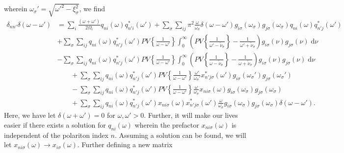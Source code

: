 wherein $\omega_\sigma' = \sqrt{\omega'^2 - \xi_\sigma^2}$, we find
\begin{equation}
\begin{split}
\delta_{nn'}\delta(\omega - \omega') &= \sum_i\frac{(\omega + \omega')}{2\Omega_i}q_{ni}(\omega)q_{n'i}^*(\omega') + \sum_\sigma\sum_{ij}\pi^2\frac{\omega}{\omega_\sigma}\delta(\omega - \omega')g_{i\sigma}(\omega_\sigma)g_{j\sigma}(\omega_\sigma)q_{ni}(\omega)q_{n'j}^*(\omega')\\
& + \sum_\sigma\sum_{ij}q_{ni}(\omega)q_{n'j}^*(\omega')PV\left\{\frac{1}{\omega - \omega'}\right\}\int_0^\infty\left(PV\left\{\frac{1}{\omega' - \tilde{\nu}_\sigma}\right\} - \frac{1}{\omega' + \tilde{\nu}_\sigma}\right)g_{i\sigma}(\nu)g_{j\sigma}(\nu)\;\mathrm{d}\nu\\
&- \sum_\sigma\sum_{ij}q_{ni}(\omega)q_{n'j}^*(\omega')PV\left\{\frac{1}{\omega - \omega'}\right\}\int_0^\infty\left(PV\left\{\frac{1}{\omega - \tilde{\nu}_\sigma}\right\} - \frac{1}{\omega + \tilde{\nu}_\sigma}\right)g_{i\sigma}(\nu)g_{j\sigma}(\nu)\;\mathrm{d}\nu\\
&\qquad + \sum_{\sigma}\sum_{ij}q_{ni}(\omega)q_{n'j}^*(\omega')PV\left\{\frac{1}{\omega - \omega'}\right\}\frac{\omega'}{\omega_\sigma'}x_{n'j\sigma}^*(\omega')g_{i\sigma}(\omega_\sigma')g_{j\sigma}(\omega_\sigma')\\
&\qquad - \sum_{\sigma}\sum_{ij}q_{ni}(\omega)q_{n'j}^*(\omega')PV\left\{\frac{1}{\omega - \omega'}\right\}\frac{\omega}{\omega_\sigma}x_{ni\sigma}(\omega)g_{i\sigma}(\omega_\sigma)g_{j\sigma}(\omega_\sigma)\\
&\qquad + \sum_\sigma\sum_{ij}q_{ni}(\omega)q_{n'j}^*(\omega')x_{ni\sigma}(\omega)x_{n'j\sigma}^*(\omega')\frac{\omega}{\omega_\sigma}g_{i\sigma}(\omega_\sigma)g_{j\sigma}(\omega_\sigma)\delta(\omega - \omega').
\end{split}
\end{equation}
Here, we have let $\delta(\omega + \omega') = 0$ for $\omega,\omega' > 0$. Further, it will make our lives easier if there exists a solution for $q_{ni}(\omega)$ wherein the prefactor $x_{ni\sigma}(\omega)$ is independent of the polariton index $n$. Assuming a solution can be found, we will let $x_{ni\sigma}(\omega)\to x_{i\sigma}(\omega)$. Further defining a new matrix
